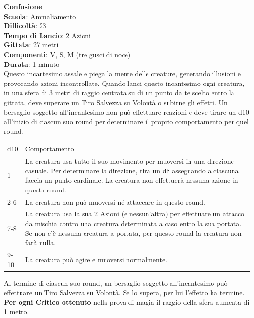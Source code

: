 \begin{multicols}{2}
\medskip\textbf{Confusione}\\
\textbf{Scuola}: Ammaliamento\\
\textbf{Difficoltà}: 23\\
\textbf{Tempo di Lancio}: 2 Azioni\\
\textbf{Gittata}: 27 metri\\
\textbf{Componenti}: V, S, M (tre gusci di noce)\\
\textbf{Durata}: 1 minuto\\
Questo incantesimo assale e piega la mente delle creature, generando illusioni e provocando azioni incontrollate. Quando lanci questo incantesimo ogni creatura, in una sfera di 3 metri di raggio centrata su di un punto da te scelto entro la gittata, deve superare un Tiro Salvezza su Volontà o subirne gli effetti. Un bersaglio soggetto all'incantesimo non può effettuare reazioni e deve tirare un d10 all'inizio di ciascun suo round per determinare il proprio comportamento per quel round. 

\medskip

\begin{tabularx}{0.45\textwidth}{lX}
	\hline 
d10 & Comportamento\\ 
1 & La creatura usa tutto il suo movimento per muoversi in una direzione casuale. Per determinare la direzione, tira un d8 assegnando a ciascuna faccia un punto cardinale. La
creatura non effettuerà nessuna azione in questo round. \\
2-6 & La creatura non può muoversi né attaccare in questo round.\\
7-8 & La creatura usa la sua 2 Azioni (e nessun'altra) per effettuare un attacco da mischia contro una creatura determinata a caso entro la sua portata. Se non c'è nessuna creatura a portata, per questo round la creatura non farà nulla.\\
9-10 & La creatura può agire e muoversi normalmente.\\
\end{tabularx} 

\medskip

Al termine di ciascun suo round, un bersaglio soggetto all'incantesimo può effettuare un Tiro Salvezza su Volontà. Se lo supera, per lui l'effetto ha termine. \\
\textbf{Per ogni Critico ottenuto} nella prova di magia il raggio della sfera aumenta di 1 metro.


\end{multicols}

